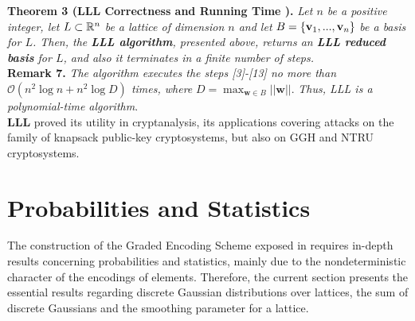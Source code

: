 \textbf{Theorem 3 (LLL Correctness and Running Time \cite{HPS08}).} \textit{Let $n$ be a positive integer, let $L \subset \mathbb{R}^n$ be a lattice of dimension $n$ and let} $B = \{\textbf{v}_1,...,\textbf{v}_n\}$ \textit{be a basis for $L$. Then, the \textbf{LLL algorithm}, presented above, returns an \textbf{LLL reduced basis} for $L$, and also it terminates in a finite number of steps.}\\

\textbf{Remark 7.} \textit{The algorithm executes the steps [3]-[13] no more than $\mathcal{O}(n^2 \log n + n^2 \log D)$ times, where} $D = \displaystyle{\max_{\textbf{w} \in B} ||\textbf{w}||}$. \textit{Thus, LLL is a polynomial-time algorithm}.\\

\textbf{LLL} proved its utility in cryptanalysis, its applications covering attacks on the family of knapsack public-key cryptosystems, but also on GGH and NTRU cryptosystems. 

\section{Probabilities and Statistics}

The construction of the Graded Encoding Scheme exposed in \cite{GGH13} requires in-depth results concerning probabilities and statistics, mainly due to the nondeterministic character of the encodings of elements. Therefore, the current section presents the essential results regarding discrete Gaussian distributions over lattices, the sum of discrete Gaussians and the smoothing parameter for a lattice.\\

